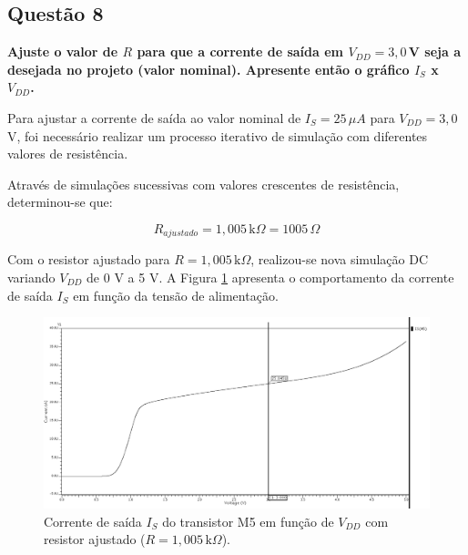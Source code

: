 \documentclass[12pt,a4paper]{article}
\begin{document}
\subsection*{Questão 8}
\begin{BoxQ}
	\textbf{Ajuste o valor de $R$ para que a corrente de saída em $V_{DD} = 3{,}0$\,V seja a desejada no projeto (valor nominal). Apresente então o gráfico $I_{S}$ x $V_{DD}$.}
\end{BoxQ}

Para ajustar a corrente de saída ao valor nominal de $I_S = 25\,\mu A$ para $V_{DD} = 3{,}0$ V, foi necessário realizar um processo iterativo de simulação com diferentes valores de resistência.

Através de simulações sucessivas com valores crescentes de resistência, determinou-se que:

\begin{equation}
R_{ajustado} = 1{,}005\,\text{k}\Omega = 1005\,\Omega
\end{equation}


Com o resistor ajustado para $R = 1{,}005\,\text{k}\Omega$, realizou-se nova simulação DC variando $V_{DD}$ de 0 V a 5 V. A Figura \ref{fig:corrente_m5_r_ajustado} apresenta o comportamento da corrente de saída $I_S$ em função da tensão de alimentação.

\begin{figure}[H]
    \centering
    \includegraphics[width=1\textwidth]{images/corrente_m5_r_ajustado.png}
    \caption{Corrente de saída $I_S$ do transistor M5 em função de $V_{DD}$ com resistor ajustado ($R = 1{,}005\,\text{k}\Omega$).}
    \label{fig:corrente_m5_r_ajustado}
\end{figure}
\end{document}

